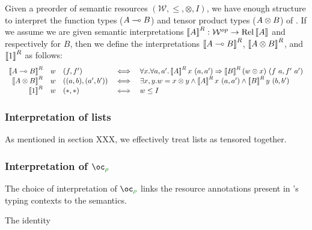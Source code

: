 Given a preorder of semantic resources
$(\mathcal{W}, \leq, \otimes, I)$, we have enough structure to
interpret the function types ($A \multimap B$) and tensor product types
($A \otimes B$) of \name{}. If we assume we are given semantic
interpretations
$\left\llbracket A \right\rrbracket^R : \mathcal{W}^{op} \to \operatorname{Rel}{\left\llbracket A \right\rrbracket}$ and
respectively for $B$, then we define the interpretations
$\left\llbracket A \multimap B \right\rrbracket^R$, $\left\llbracket A \otimes B \right\rrbracket^R$, and
$\left\llbracket 1 \right\rrbracket^R$ as follows:
\begin{displaymath}
  \begin{array}{rllcl}
    \left\llbracket A \multimap B \right\rrbracket^R & w & (f,f')
    &\iff& \forall x. \forall a,a'.\left\llbracket A \right\rrbracket^Rx~(a,a')
           \Rightarrow \left\llbracket B \right\rrbracket^R(w \otimes x)~(f~a,f'~a')
    \\
    \left\llbracket A \otimes B \right\rrbracket^R & w & ((a,b),(a',b'))
    &\iff& \exists x,y.
           w = x \otimes y
           \wedge \left\llbracket A \right\rrbracket^Rx~(a,a')
           \wedge \left\llbracket B \right\rrbracket^Ry~(b,b')
    \\
    \left\llbracket 1 \right\rrbracket^R & w & (*,*) &\iff& w \leq I
  \end{array}
\end{displaymath}



\subsubsection{Interpretation of lists}

As mentioned in section XXX, we effectively treat lists as tensored
together. 

\subsubsection{Interpretation of $\excl{\rho}{}$}

The choice of interpretation of $\excl{\rho}{}$ links the resource
annotations present in \name{}'s typing contexts to the semantics.

\begin{example}[Trivial]
  The identity
\end{example}

